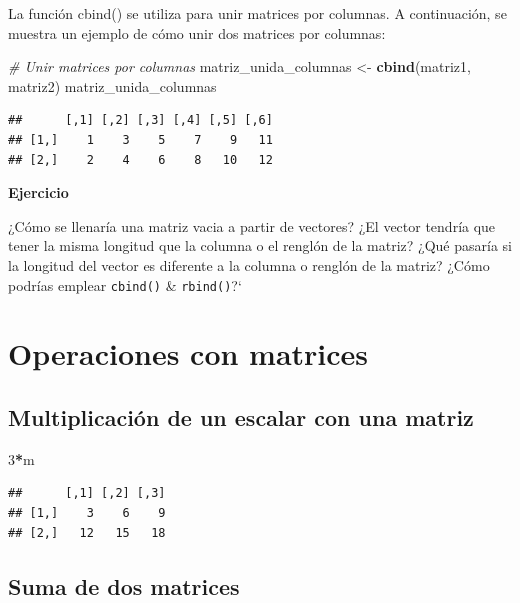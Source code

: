 \documentclass[
]{book}
\newenvironment{Shaded}{\begin{snugshade}}{\end{snugshade}}
\newcommand{\CommentTok}[1]{\textcolor[rgb]{0.56,0.35,0.01}{\textit{#1}}}
\newcommand{\DecValTok}[1]{\textcolor[rgb]{0.00,0.00,0.81}{#1}}
\newcommand{\FunctionTok}[1]{\textcolor[rgb]{0.13,0.29,0.53}{\textbf{#1}}}
\newcommand{\NormalTok}[1]{#1}
\newcommand{\OtherTok}[1]{\textcolor[rgb]{0.56,0.35,0.01}{#1}}
\newcommand{\SpecialCharTok}[1]{\textcolor[rgb]{0.81,0.36,0.00}{\textbf{#1}}}
\begin{document}
La función cbind() se utiliza para unir matrices por columnas. A continuación, se muestra un ejemplo de cómo unir dos matrices por columnas:

\begin{Shaded}
\begin{Highlighting}[]
\CommentTok{\# Unir matrices por columnas}
\NormalTok{matriz\_unida\_columnas }\OtherTok{\textless{}{-}} \FunctionTok{cbind}\NormalTok{(matriz1, matriz2)}
\NormalTok{matriz\_unida\_columnas}
\end{Highlighting}
\end{Shaded}

\begin{verbatim}
##      [,1] [,2] [,3] [,4] [,5] [,6]
## [1,]    1    3    5    7    9   11
## [2,]    2    4    6    8   10   12
\end{verbatim}

\textbf{Ejercicio}

¿Cómo se llenaría una matriz vacia a partir de vectores?
¿El vector tendría que tener la misma longitud que la columna o el renglón de la matriz?
¿Qué pasaría si la longitud del vector es diferente a la columna o renglón de la matriz?
¿Cómo podrías emplear \texttt{cbind()} \& \texttt{rbind()}?{}`

\section{Operaciones con matrices}\label{operaciones-con-matrices}

\subsection{Multiplicación de un escalar con una matriz}\label{multiplicaciuxf3n-de-un-escalar-con-una-matriz}

\begin{Shaded}
\begin{Highlighting}[]
\DecValTok{3}\SpecialCharTok{*}\NormalTok{m}
\end{Highlighting}
\end{Shaded}

\begin{verbatim}
##      [,1] [,2] [,3]
## [1,]    3    6    9
## [2,]   12   15   18
\end{verbatim}

\subsection{Suma de dos matrices}\label{suma-de-dos-matrices}
\end{document}
